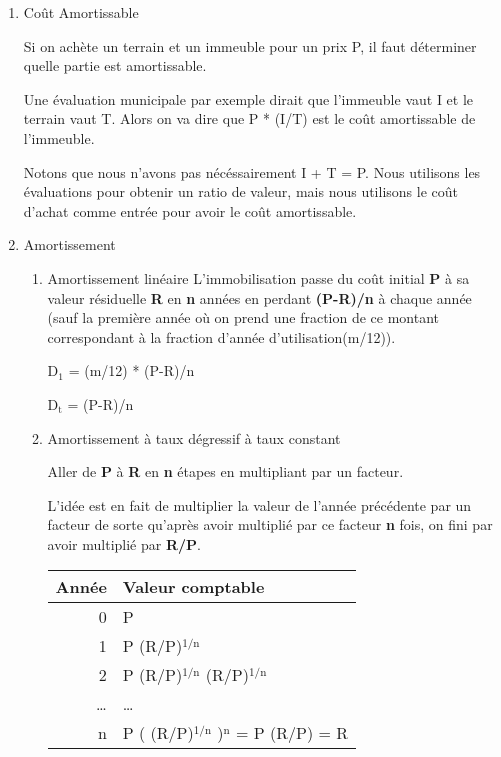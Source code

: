 \documentclass[11pt]{article}
\begin{document}
\begin{enumerate}
\item Coût Amortissable
\label{sec:orgb3af773}

Si on achète un terrain et un immeuble pour un prix P, il faut déterminer quelle
partie est amortissable.

Une évaluation municipale par exemple dirait que l'immeuble vaut I et le terrain
vaut T.  Alors on va dire que P * (I/T) est le coût amortissable de l'immeuble.

Notons que nous n'avons pas nécéssairement I + T = P.  Nous utilisons les
évaluations pour obtenir un ratio de valeur, mais nous utilisons le coût d'achat
comme entrée pour avoir le coût amortissable.

\item Amortissement
\label{sec:org4eec26d}
\begin{enumerate}
\item Amortissement linéaire
\label{sec:orgc807cbb}
L'immobilisation passe du coût initial \textbf{P} à sa valeur résiduelle \textbf{R} en \textbf{n}
années en perdant \textbf{(P-R)/n} à chaque année (sauf la première année où on prend
une fraction de ce montant correspondant à la fraction d'année d'utilisation(m/12)).

D\(_{\text{1}}\) = (m/12) * (P-R)/n

D\(_{\text{t}}\) = (P-R)/n

\item Amortissement à taux dégressif à taux constant
\label{sec:orge8e164f}

Aller de \textbf{P} à \textbf{R} en \textbf{n} étapes en multipliant par un facteur.

L'idée est en fait de multiplier la valeur de l'année précédente par un facteur
de sorte qu'après avoir multiplié par ce facteur \textbf{n} fois, on fini par avoir
multiplié par \textbf{R/P}.

\begin{center}
\begin{tabular}{rl}
Année & Valeur comptable\\
\hline
0 & P\\
1 & P (R/P)\(^{\text{1/n}}\)\\
2 & P (R/P)\(^{\text{1/n}}\) (R/P)\(^{\text{1/n}}\)\\
\dots{} & \dots{}\\
n & P ( (R/P)\(^{\text{1/n}}\) )\(^{\text{n}}\) = P (R/P) = R\\
\end{tabular}
\end{center}



\end{enumerate}
\end{enumerate}
\end{document}

